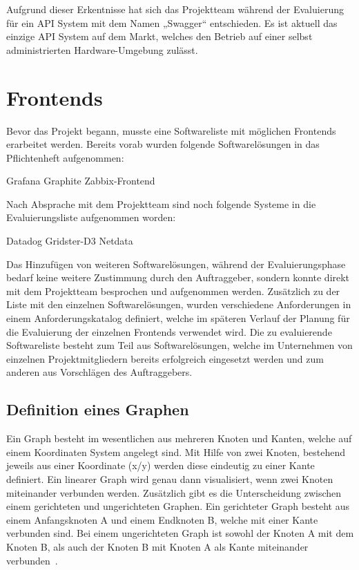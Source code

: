 Aufgrund dieser Erkentnisse hat sich das Projektteam während der Evaluierung
für ein API System mit dem Namen „Swagger“ entschieden. Es ist aktuell das
einzige API System auf dem Markt, welches den Betrieb auf einer selbst
administrierten Hardware-Umgebung zulässt.
\nl%

\section{Frontends}
\label{sec:frontends}
Bevor das Projekt begann, musste eine Softwareliste mit möglichen Frontends
erarbeitet werden. Bereits vorab wurden folgende Softwarelösungen in das
Pflichtenheft aufgenommen:

\begin{outline}
  \1 Grafana
  \1 Graphite
  \1 Zabbix-Frontend
\end{outline}

Nach Absprache mit dem Projektteam sind noch folgende Systeme in die
Evaluierungsliste aufgenommen worden:

\begin{outline}
  \1 Datadog
  \1 Gridster-D3
  \1 Netdata
\end{outline}

Das Hinzufügen von weiteren Softwarelösungen, während der Evaluierungsphase
bedarf keine weitere Zustimmung durch den Auftraggeber, sondern konnte direkt
mit dem Projektteam besprochen und aufgenommen werden. Zusätzlich zu der Liste
mit den einzelnen Softwarelösungen, wurden verschiedene Anforderungen in einem
Anforderungskatalog definiert, welche im späteren Verlauf der Planung für die
Evaluierung der einzelnen Frontends verwendet wird. Die zu evaluierende
Softwareliste besteht zum Teil aus Softwarelösungen, welche im Unternehmen von
einzelnen Projektmitgliedern bereits erfolgreich eingesetzt werden und zum
anderen aus Vorschlägen des Auftraggebers.
\mr%

\subsection{Definition eines Graphen}
\label{definition_eines_graphen}
Ein Graph besteht im wesentlichen aus mehreren Knoten und Kanten, welche auf
einem Koordinaten System angelegt sind. Mit Hilfe von zwei Knoten, bestehend
jeweils aus einer Koordinate (x/y) werden diese eindeutig zu einer Kante
definiert. Ein linearer Graph wird genau dann visualisiert, wenn zwei Knoten
miteinander verbunden werden. Zusätzlich gibt es die Unterscheidung zwischen
einem gerichteten und ungerichteten Graphen. Ein gerichteter Graph besteht aus
einem Anfangsknoten A und einem Endknoten B, welche mit einer Kante verbunden
sind. Bei einem ungerichteten Graph ist sowohl der Knoten A mit dem Knoten B,
als auch der Knoten B mit Knoten A als Kante miteinander
verbunden~\cite{kaiser2008c}.


